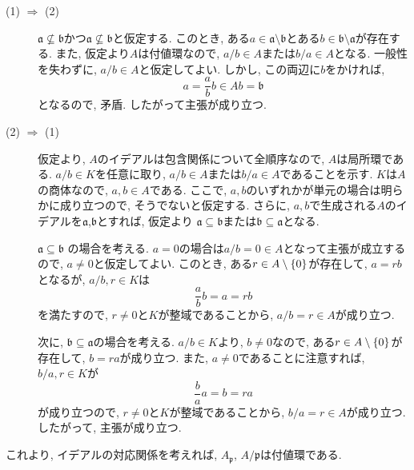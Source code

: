 \documentclass[dvipdfmx]{jsarticle}
\begin{document}
    \begin{problem}
        \begin{description}
            \item[(1) $\Rightarrow$ (2)]
            $\mathfrak{a} \not \subseteq \mathfrak{b}$かつ$\mathfrak{a} \not \subseteq \mathfrak{b}$と仮定する.
            このとき, ある$a \in \mathfrak{a} \setminus \mathfrak{b}$とある$b \in \mathfrak{b} \setminus \mathfrak{a}$が存在する.
            また, 仮定より$A$は付値環なので,
            $a/b \in A$または$b/a \in A$となる.
            一般性を失わずに, $a/b \in A$と仮定してよい.
            しかし, この両辺に$b$をかければ,
            \[
                a = \frac{a}{b}b \in Ab= \mathfrak{b}
            \]
            となるので, 矛盾.
            したがって主張が成り立つ.
            \item[(2) $\Rightarrow$ (1)]
            仮定より, $A$のイデアルは包含関係について全順序なので,
            $A$は局所環である.
            $a/b \in K$を任意に取り, $a/b \in A$または$b/a \in A$であることを示す.
            $K$は$A$の商体なので, $a, b \in A$である.
            ここで, $a,b$のいずれかが単元の場合は明らかに成り立つので,
            そうでないと仮定する.
            さらに, $a,b$で生成される$A$のイデアルを$\mathfrak{a}$,$\mathfrak{b}$とすれば,
            仮定より $\mathfrak{a} \subseteq \mathfrak{b}$または$\mathfrak{b} \subseteq \mathfrak{a}$となる.

            $\mathfrak{a} \subseteq \mathfrak{b}$
            の場合を考える.
            $a = 0$の場合は$a/b = 0 \in A$となって主張が成立するので, $a \neq 0$と仮定してよい.
            このとき, ある$r \in A \setminus \{0\}$が存在して, $a = rb$となるが,
            $a/b, r \in K$は
            \[
                \frac{a}{b}b = a =  rb
            \]
            を満たすので, $r \neq 0$と$K$が整域であることから, $a/b = r \in A$が成り立つ.

            次に, $\mathfrak{b} \subseteq \mathfrak{a}$の場合を考える.
            $a/b \in K$より, $b\neq 0$なので, ある$r \in A \setminus \{0\}$が存在して,
            $b = ra$が成り立つ.
            また, $a \neq 0$であることに注意すれば,
            $b/a, r \in K$が
            \[
                \frac{b}{a}a = b =  ra
            \]
            が成り立つので, $r \neq 0$と$K$が整域であることから, $b/a = r \in A$が成り立つ.
            したがって, 主張が成り立つ.
        \end{description}
        これより, イデアルの対応関係を考えれば, $A_\mathfrak{p}$, $A/\mathfrak{p}$は付値環である.
    \end{problem}
\end{document}
